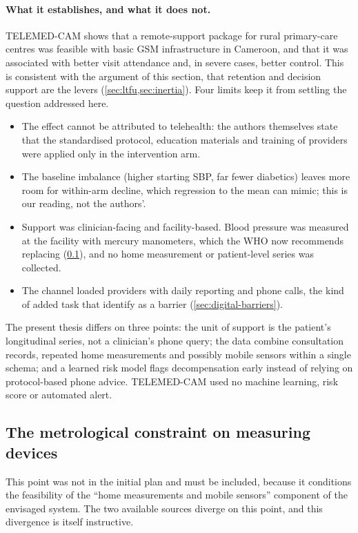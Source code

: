 \documentclass[12pt,a4paper,oneside]{report}
\begin{document}
\paragraph{What it establishes, and what it does not.} TELEMED-CAM shows that a remote-support package for rural primary-care centres was feasible with basic GSM infrastructure in Cameroon, and that it was associated with better visit attendance and, in severe cases, better control. This is consistent with the argument of this section, that retention and decision support are the levers (\cref{sec:ltfu,sec:inertia}). Four limits keep it from settling the question addressed here.
\begin{itemize}[nosep]
  \item The effect cannot be attributed to telehealth: the authors themselves state that the standardised protocol, education materials and training of providers were applied only in the intervention arm.
  \item The baseline imbalance (higher starting SBP, far fewer diabetics) leaves more room for within-arm decline, which regression to the mean can mimic; this is our reading, not the authors'.
  \item Support was clinician-facing and facility-based. Blood pressure was measured at the facility with mercury manometers, which the WHO now recommends replacing (\cref{sec:metrology}), and no home measurement or patient-level series was collected.
  \item The channel loaded providers with daily reporting and phone calls, the kind of added task that \textcite{dodoo2022} identify as a barrier (\cref{sec:digital-barriers}).
\end{itemize}
The present thesis differs on three points: the unit of support is the patient's longitudinal series, not a clinician's phone query; the data combine consultation records, repeated home measurements and possibly mobile sensors within a single schema; and a learned risk model flags decompensation early instead of relying on protocol-based phone advice. TELEMED-CAM used no machine learning, risk score or automated alert.

\subsection{The metrological constraint on measuring devices}\label{sec:metrology}

This point was not in the initial plan and must be included, because it conditions the feasibility of the ``home measurements and mobile sensors'' component of the envisaged system. The two available sources diverge on this point, and this divergence is itself instructive.
\end{document}
